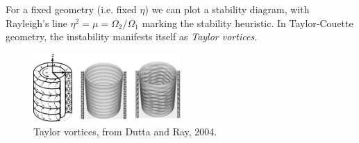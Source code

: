 \documentclass{jknotes}
\begin{document}
For a fixed geometry (i.e. fixed $\eta$) we can plot a stability diagram, with
Rayleigh's line $\eta^2 = \mu = \Omega_2 / \Omega_1$ marking the stability
heuristic. In Taylor-Couette geometry, the instability manifests itself as
\emph{Taylor vortices}.

\begin{figure}
	\centering
	\includegraphics[width=0.5\textwidth]{taylor_vortices.jpg}
	\caption{Taylor vortices, from Dutta and Ray, 2004.}
\end{figure}
\end{document}
